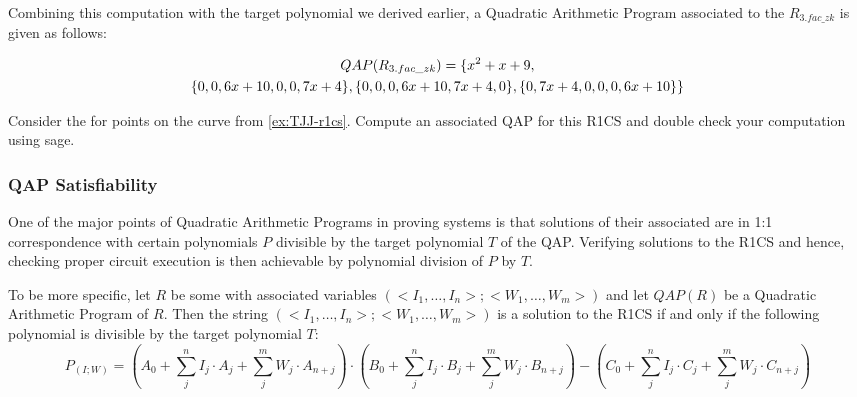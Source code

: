 \begin{example}[3-factorization]
Combining this computation with the target polynomial we derived earlier, a Quadratic Arithmetic Program associated to the  $R_{3.fac\_zk}$ is given as follows:

\begin{multline}
\label{QAP-R3-fac-zk}
QAP(R_{3.fac\_zk}) =\{x^{2}+x+9,\notag\\
 \{0,0,6x+10,0,0,7x+4\},\{0,0,0,6x+10,7x+4,0\},\{0,7x+4,0,0,0,6x+10\}\}
\end{multline}
\end{example}
\begin{exercise}
Consider the  for points on the  curve from \examplename{} \ref{ex:TJJ-r1cs}. Compute an associated QAP for this R1CS and double check your computation using sage.
\end{exercise}
\subsubsection{QAP Satisfiability} One of the major points of Quadratic Arithmetic Programs in proving systems is that solutions of their associated  are in 1:1 correspondence with certain polynomials $P$ divisible by the target polynomial $T$ of the QAP. Verifying solutions to the R1CS and hence, checking proper circuit execution is then achievable by polynomial division of $P$ by $T$.

To be more specific, let $R$ be some  with associated variables $(<I_1,\ldots,I_n>; <W_1,\ldots, W_m>)$ and let $QAP(R)$ be a Quadratic Arithmetic Program of $R$. Then the string $(<I_1,\ldots,I_n>; <W_1,\ldots, W_m>)$ is a solution to the R1CS if and only if the following polynomial is divisible by the target polynomial $T$:
\begin{equation}\label{polynomial-P-IW}
P_{(I;W)} = \scriptstyle \left(A_0 + \sum_{j}^n I_j\cdot A_j + \sum_{j}^m W_j\cdot A_{n+j} \right) \cdot \left(B_0 + \sum_{j}^n I_j\cdot B_j + \sum_{j}^m W_j\cdot B_{n+j} \right) 
-\left(C_0 + \sum_{j}^n I_j\cdot C_j + \sum_{j}^m W_j\cdot C_{n+j} \right)
\end{equation}

